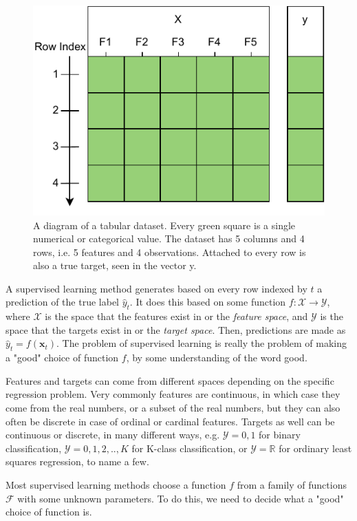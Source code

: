 \begin{figure}
  \centering
  \includegraphics{Pictures/tabular_dataset.pdf}
  \caption{A diagram of a tabular dataset. Every green square is a single
  numerical or categorical value. The dataset has 5 columns and 4 rows, i.e. 5
  features and 4 observations. Attached to every row is also a true target, seen
  in the vector y.}
  \label{fig:tab_data}
\end{figure}

A supervised learning method generates based on every row indexed by $t$ a
prediction of the true label $\hat y_t$. It does this based on some function $f
: \mathcal X \rightarrow \mathcal Y$, where $\mathcal X$ is the space that the
features exist in or the \emph{feature space}, and $\mathcal Y$ is the space
that the targets exist in or the \emph{target space}. Then, predictions are made
as $\hat y_t = f(\mathbf{x}_t)$. The problem of supervised learning is really
the problem of making a "good" choice of function $f$, by some understanding of
the word good.

Features and targets can come from different spaces depending on the specific
regression problem. Very commonly features are continuous, in which case they
come from the real numbers, or a subset of the real numbers, but they can also
often be discrete in case of ordinal or cardinal features. Targets as well can
be continuous or discrete, in many different ways, e.g. $\mathcal Y = {0,1}$
for binary classification, $\mathcal Y = {0,1,2,..,K}$ for K-class
classification, or $\mathcal Y = \mathbb R$ for ordinary least squares
regression, to name a few.

Most supervised learning methods choose a function $f$ from a family of
functions $\mathcal F$ with some unknown parameters. To do this, we need to
decide what a "good" choice of function is.

